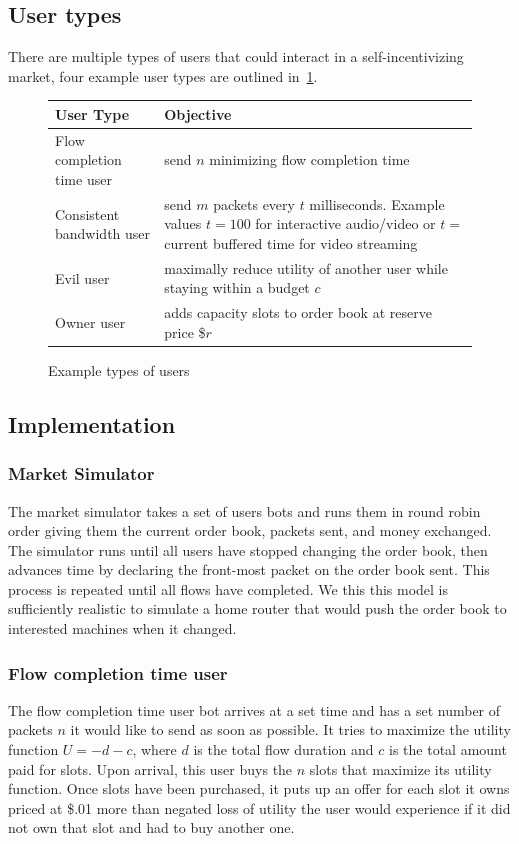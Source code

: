 \subsection{User types}
There are multiple types of users that could interact in a self-incentivizing market, four example user types are outlined in~\ref{f:user_types}.
\begin{figure}
\begin{tabular}{|p{}|p{}|}
\hline
User Type & Objective \\
\hline
Flow completion time user & send $n$ minimizing flow completion time \\
\hline
Consistent bandwidth user & send $m$ packets every $t$ milliseconds. Example values $t=100$ for interactive audio/video or $t=$ current buffered time for video streaming \\
\hline
Evil user & maximally reduce utility of another user while staying within a budget $c$ \\
\hline
Owner user & adds capacity slots to order book at reserve price \$$r$\\
\hline
\end{tabular}
\caption{Example types of users}
\label{f:user_types}
\end{figure}

\subsection{Implementation}
\subsubsection{Market Simulator}
The market simulator takes a set of users bots and runs them in round robin order giving them the current order book, packets sent, and money exchanged. The simulator runs until all users have stopped changing the order book, then advances time by declaring the front-most packet on the order book sent. This process is repeated until all flows have completed. We this this model is sufficiently realistic to simulate a home router that would push the order book to interested machines when it changed.

\subsubsection{Flow completion time user}
The flow completion time user bot arrives at a set time and has a set number of packets $n$ it would like to send as soon as possible. It tries to maximize the utility function $U= -d - c$, where $d$ is the total flow duration and $c$ is the total amount paid for slots.
Upon arrival, this user buys the $n$ slots that maximize its utility function. Once slots have been purchased, it puts up an offer for each slot it owns priced at \$.01 more than negated loss of utility the user would experience if it did not own that slot and had to buy another one.


